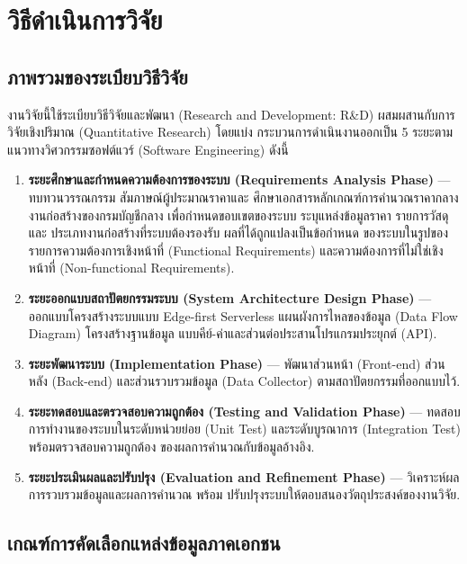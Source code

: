 \chapter{วิธีดำเนินการวิจัย}
\label{ch:method}

\section{ภาพรวมของระเบียบวิธีวิจัย}
\label{sec:research-method}

งานวิจัยนี้ใช้ระเบียบวิธีวิจัยและพัฒนา (Research and Development:
R\&D) ผสมผสานกับการวิจัยเชิงปริมาณ (Quantitative Research) โดยแบ่ง
กระบวนการดำเนินงานออกเป็น 5 ระยะตามแนวทางวิศวกรรมซอฟต์แวร์ (Software
Engineering) ดังนี้

\begin{enumerate}[leftmargin=2em,itemsep=0.3em]
  \item \textbf{ระยะศึกษาและกำหนดความต้องการของระบบ (Requirements
        Analysis Phase)} --- ทบทวนวรรณกรรม สัมภาษณ์ผู้ประมาณราคาและ
        ศึกษาเอกสารหลักเกณฑ์การคำนวณราคากลางงานก่อสร้างของกรมบัญชีกลาง
        เพื่อกำหนดขอบเขตของระบบ ระบุแหล่งข้อมูลราคา รายการวัสดุ และ
        ประเภทงานก่อสร้างที่ระบบต้องรองรับ ผลที่ได้ถูกแปลงเป็นข้อกำหนด
        ของระบบในรูปของรายการความต้องการเชิงหน้าที่ (Functional
        Requirements) และความต้องการที่ไม่ใช่เชิงหน้าที่ (Non-functional
        Requirements).
  \item \textbf{ระยะออกแบบสถาปัตยกรรมระบบ (System Architecture Design
        Phase)} --- ออกแบบโครงสร้างระบบแบบ Edge-first Serverless
        แผนผังการไหลของข้อมูล (Data Flow Diagram) โครงสร้างฐานข้อมูล
        แบบคีย์-ค่าและส่วนต่อประสานโปรแกรมประยุกต์ (API).
  \item \textbf{ระยะพัฒนาระบบ (Implementation Phase)} --- พัฒนาส่วนหน้า
        (Front-end) ส่วนหลัง (Back-end) และส่วนรวบรวมข้อมูล (Data
        Collector) ตามสถาปัตยกรรมที่ออกแบบไว้.
  \item \textbf{ระยะทดสอบและตรวจสอบความถูกต้อง (Testing and Validation
        Phase)} --- ทดสอบการทำงานของระบบในระดับหน่วยย่อย (Unit Test)
        และระดับบูรณาการ (Integration Test) พร้อมตรวจสอบความถูกต้อง
        ของผลการคำนวณกับข้อมูลอ้างอิง.
  \item \textbf{ระยะประเมินผลและปรับปรุง (Evaluation and Refinement
        Phase)} --- วิเคราะห์ผลการรวบรวมข้อมูลและผลการคำนวณ พร้อม
        ปรับปรุงระบบให้ตอบสนองวัตถุประสงค์ของงานวิจัย.
\end{enumerate}

\section{เกณฑ์การคัดเลือกแหล่งข้อมูลภาคเอกชน}
\label{sec:retailer-selection}

